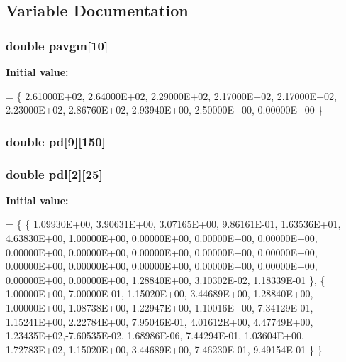 \subsection{Variable Documentation}
\hypertarget{nrlmsise-00__data_8c_ad9e05d1fb99e07d634b35cdde6c978dc}{
\subsubsection[{pavgm}]{\setlength{\rightskip}{0pt plus 5cm}double pavgm\mbox{[}10\mbox{]}}}\label{nrlmsise-00__data_8c_ad9e05d1fb99e07d634b35cdde6c978dc}
{\bfseries Initial value\+:}
\begin{DoxyCode}
= \{
     2.61000E+02, 2.64000E+02, 2.29000E+02, 2.17000E+02, 2.17000E+02,
     2.23000E+02, 2.86760E+02,-2.93940E+00, 2.50000E+00, 0.00000E+00 \}
\end{DoxyCode}
\hypertarget{nrlmsise-00__data_8c_a9d7bc0edd2bc401a23d0bb6bbdcc261d}{
\subsubsection[{pd}]{\setlength{\rightskip}{0pt plus 5cm}double pd\mbox{[}9\mbox{]}\mbox{[}150\mbox{]}}}\label{nrlmsise-00__data_8c_a9d7bc0edd2bc401a23d0bb6bbdcc261d}
\hypertarget{nrlmsise-00__data_8c_adefb8cc23535073a700d4009d0343679}{
\subsubsection[{pdl}]{\setlength{\rightskip}{0pt plus 5cm}double pdl\mbox{[}2\mbox{]}\mbox{[}25\mbox{]}}}\label{nrlmsise-00__data_8c_adefb8cc23535073a700d4009d0343679}
{\bfseries Initial value\+:}
\begin{DoxyCode}
= \{
   \{ 1.09930E+00, 3.90631E+00, 3.07165E+00, 9.86161E-01, 1.63536E+01,
     4.63830E+00, 1.00000E+00, 0.00000E+00, 0.00000E+00, 0.00000E+00,
     0.00000E+00, 0.00000E+00, 0.00000E+00, 0.00000E+00, 0.00000E+00,
     0.00000E+00, 0.00000E+00, 0.00000E+00, 0.00000E+00, 0.00000E+00,
     0.00000E+00, 0.00000E+00, 1.28840E+00, 3.10302E-02, 1.18339E-01 \}, 
   \{ 1.00000E+00, 7.00000E-01, 1.15020E+00, 3.44689E+00, 1.28840E+00,
     1.00000E+00, 1.08738E+00, 1.22947E+00, 1.10016E+00, 7.34129E-01,
     1.15241E+00, 2.22784E+00, 7.95046E-01, 4.01612E+00, 4.47749E+00,
     1.23435E+02,-7.60535E-02, 1.68986E-06, 7.44294E-01, 1.03604E+00,
     1.72783E+02, 1.15020E+00, 3.44689E+00,-7.46230E-01, 9.49154E-01 \}
\}
\end{DoxyCode}

